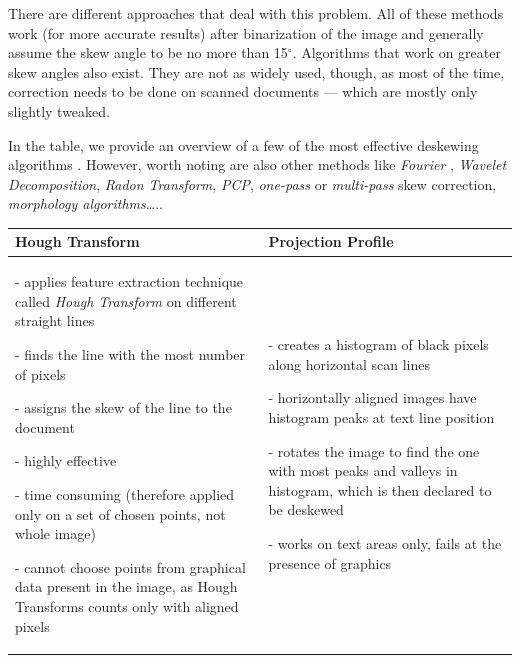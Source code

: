 There are different approaches that deal with this problem. All of these methods work (for more accurate results) after binarization of the image and generally assume the skew angle to be no more than 15$^{\circ}$. Algorithms that work on greater skew angles also exist\citep{skewAngleDetection}. They are not as widely used, though, as most of the time, correction needs to be done on scanned documents --- which are mostly only slightly tweaked.

In the  table, we provide an overview of a few of the most effective deskewing algorithms \citep{skewBestTechniques}. However, worth noting are also other methods like \emph{Fourier} \citep{fourierTransform}, \emph{Wavelet Decomposition}, \emph{Radon Transform}, \emph{PCP}, \emph{one-pass} or \emph{multi-pass} skew correction, \emph{morphology algorithms}\ldots.. 

\begin{longtable}{p{19em}p{19em}}
\textbf{Hough Transform} & \textbf{Projection Profile}\\
\midrule

- applies feature extraction technique called \emph{Hough Transform} \citep{houghTransform} on different straight lines

- finds the line with the most number of pixels

- assigns the skew of the line to the document

- highly effective

- time consuming (therefore applied only on a set of chosen points, not whole image)

- cannot choose points from graphical data present in the image, as Hough Transforms counts only with aligned pixels

&

- creates a histogram of black pixels along horizontal scan lines

- horizontally aligned images have histogram peaks at text line position

- rotates the image to find the one with most peaks and valleys in histogram, which is then declared to be deskewed

- works on text areas only, fails at the presence of graphics

\end{longtable}


